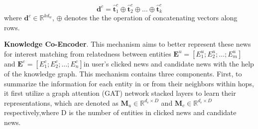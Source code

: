 \documentclass[withoutpreface,bwprint]{cumcmthesis} %
\begin{document}
	\begin{equation}\label{eta}
	\mathbf{d}^c= \hat{\mathbf{t}}_1^c \oplus \hat{\mathbf{t}}_2^c \oplus \ldots \oplus \hat{\mathbf{t}}_k^c
	\end{equation}\label{eta}
	where $\mathbf{d}^c \in \mathbb{R}^{kd_w}$, $\oplus$ denotes the the operation of concatenating vectors along rows.\par
	\textbf{Knowledge Co-Encoder}.
	This mechanism aims to better represent these news for interest matching from relatedness between entities $\mathbf{E}^{u} =[E^u_1;E^u_2;\dots;E^u_m] $ and $\mathbf{E}^{c} = [E^c_1;E^c_2;\dots;E^c_n] $in user’s clicked news and candidate news with the help of the knowledge graph. This mechanism contains three components. First, to summarize the information for each entity in or from their neighbors within hops, it first utilize a graph attention (GAT) network stacked layers to learn their representations, which are denoted as $\mathbf{M}_u \in \mathbb{R}^{d_e \times D}$ and $\mathbf{M}_c \in \mathbb{R}^{d_e \times D}$ respectively,where D is the number of entities in clicked news and candidate news.
	
\end{document}
